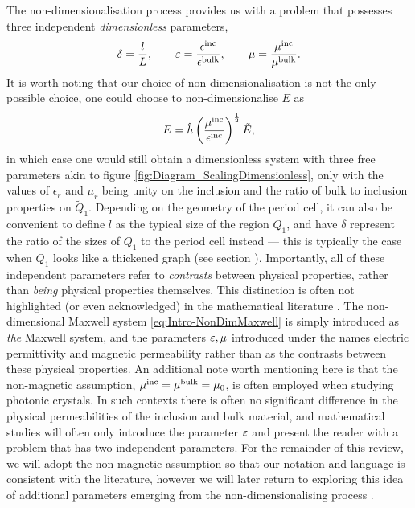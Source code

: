 The non-dimensionalisation process provides us with a problem that possesses three independent \emph{dimensionless} parameters,
\begin{align*}
	\delta = \frac{l}{L}, \qquad
	\varepsilon = \frac{\epsilon^{\mathrm{inc}}}{\epsilon^{\mathrm{bulk}}}, \qquad
	\mu = \frac{\mu^{\mathrm{inc}}}{\mu^{\mathrm{bulk}}}.
\end{align*}
It is worth noting that our choice of non-dimensionalisation is not the only possible choice, one could choose to non-dimensionalise $E$ as
\begin{align*}
	E = \hat{h}\left( \frac{\mu^{\mathrm{inc}}}{\epsilon^{\mathrm{inc}}} \right)^{\frac{1}{2}}\tilde{E},
\end{align*}
in which case one would still obtain a dimensionless system with three free parameters akin to figure \ref{fig:Diagram_ScalingDimensionless}, only with the values of $\epsilon_r$ and $\mu_r$ being unity on the inclusion and the ratio of bulk to inclusion properties on $\tilde{Q}_1$.
Depending on the geometry of the period cell, it can also be convenient to define $l$ as the typical size of the region $Q_1$, and have $\delta$ represent the ratio of the sizes of $Q_1$ to the period cell instead --- this is typically the case when $Q_1$ looks like a thickened graph (see section ).
Importantly, all of these independent parameters refer to \emph{contrasts} between physical properties, rather than \emph{being} physical properties themselves.
This distinction is often not highlighted (or even acknowledged) in the mathematical literature .
The non-dimensional Maxwell system \eqref{eq:Intro-NonDimMaxwell} is simply introduced as \emph{the} Maxwell system, and the parameters $\varepsilon, \mu$ introduced under the names electric permittivity and magnetic permeability rather than as the contrasts between these physical properties.
An additional note worth mentioning here is that the non-magnetic assumption, $\mu^{\mathrm{inc}}=\mu^{\mathrm{bulk}}=\mu_0$, is often employed when studying photonic crystals.
In such contexts there is often no significant difference in the physical permeabilities of the inclusion and bulk material, and mathematical studies will often only introduce the parameter $\varepsilon$ and present the reader with a problem that has two independent parameters.
For the remainder of this review, we will adopt the non-magnetic assumption so that our notation and language is consistent with the literature, however we will later return to exploring this idea of additional parameters emerging from the non-dimensionalising process .

